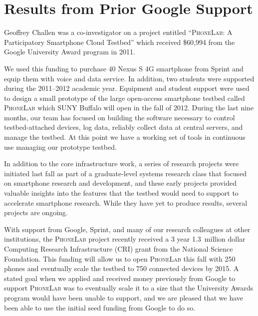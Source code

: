 \thispagestyle{numberonly}
\chapter{Results from Prior Google Support}

Geoffrey Challen was a co-investigator on a project entitled
``\textsc{PhoneLab}: A Participatory Smartphone Cloud Testbed'' which
received \$60,994 from the Google University Award program in 2011.

We used this funding to purchase 40 Nexus S 4G smartphone from Sprint and
equip them with voice and data service. In addition, two students were
supported during the 2011--2012 academic year. Equipment and student support
were used to design a small prototype of the large open-access smartphone
testbed called \textsc{PhoneLab} which SUNY Buffalo will open in the fall of
2012. During the last nine months, our team has focused on building the
software necessary to control testbed-attached devices, log data, reliably
collect data at central servers, and manage the testbed. At this point we
have a working set of tools in continuous use managing our prototype testbed.

In addition to the core infrastructure work, a series of research projects
were initiated last fall as part of a graduate-level systems research class
that focused on smartphone research and development, and these early projects
provided valuable insights into the features that the testbed would need to
support to accelerate smartphone research. While they have yet to produce
results, several projects are ongoing.

With support from Google, Sprint, and many of our research colleagues at
other institutions, the \textsc{PhoneLab} project recently received a 3 year
1.3~million dollar Computing Research Infrastructure (CRI) grant from the
National Science Foundation. This funding will allow us to open
\textsc{PhoneLab} this fall with 250 phones and eventually scale the testbed
to 750 connected devices by 2015. A stated goal when we applied and received
money previously from Google to support \textsc{PhoneLab} was to eventually
scale it to a size that the University Awards program would have been unable
to support, and we are pleased that we have been able to use the initial seed
funding from Google to do so.
